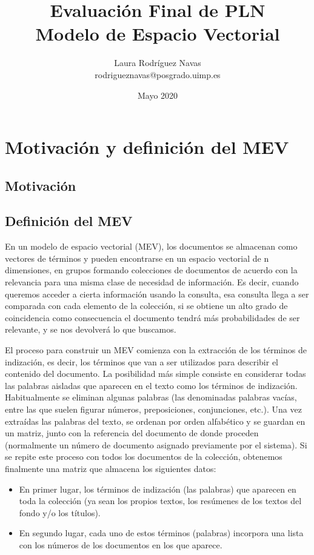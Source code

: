 \documentclass{article}
\title{Evaluación Final de PLN \\ Modelo de Espacio Vectorial}
\author{Laura Rodríguez Navas \\ rodrigueznavas@posgrado.uimp.es}
\date{Mayo 2020}
\begin{document}
\maketitle

\renewcommand{\contentsname}{Índice}
\tableofcontents

\section{Motivación y definición del MEV}

\subsection{Motivación}

\subsection{Definición del MEV}

En un modelo de espacio vectorial (MEV), los documentos se almacenan como vectores de términos y pueden encontrarse en un espacio vectorial de n dimensiones, en grupos formando colecciones de documentos de acuerdo con la relevancia para una misma clase de necesidad de información. Es decir, cuando queremos acceder a cierta información usando la consulta, esa consulta llega a ser comparada con cada elemento de la colección, si se obtiene un alto grado de coincidencia como consecuencia el documento tendrá más probabilidades de ser relevante, y se nos devolverá lo que buscamos.

El proceso para construir un MEV comienza con la extracción de los términos de indización, es decir, los términos que van a ser utilizados para describir el contenido del documento. La posibilidad más simple consiste en considerar todas las palabras aisladas que aparecen en el texto como los términos de indización. Habitualmente se eliminan algunas palabras (las denominadas palabras vacías, entre las que suelen figurar números, preposiciones, conjunciones, etc.). Una vez extraídas las palabras del texto, se ordenan por orden alfabético y se guardan en un matriz, junto con la referencia del documento de donde proceden (normalmente un número de documento asignado previamente por el sistema). Si se repite este proceso con todos los documentos de la colección, obtenemos finalmente una matriz que almacena los siguientes datos:

\begin{itemize}
	\item En primer lugar, los términos de indización (las palabras) que aparecen en toda la colección (ya sean los propios textos, los resúmenes de los textos del fondo y/o los títulos).
	\item En segundo lugar, cada uno de estos términos (palabras) incorpora una lista con los números de los documentos en los que aparece.
\end{itemize}
\end{document}
